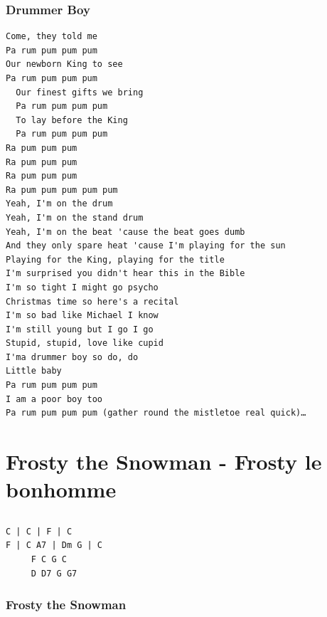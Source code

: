\documentclass[
]{article}
\begin{document}
\hypertarget{drummer-boy}{%
\subsubsection*{Drummer Boy}\label{drummer-boy}}

\begin{verbatim}
Come, they told me
Pa rum pum pum pum
Our newborn King to see
Pa rum pum pum pum
  Our finest gifts we bring
  Pa rum pum pum pum
  To lay before the King
  Pa rum pum pum pum
Ra pum pum pum
Ra pum pum pum
Ra pum pum pum
Ra pum pum pum pum pum
Yeah, I'm on the drum
Yeah, I'm on the stand drum
Yeah, I'm on the beat 'cause the beat goes dumb
And they only spare heat 'cause I'm playing for the sun
Playing for the King, playing for the title
I'm surprised you didn't hear this in the Bible
I'm so tight I might go psycho
Christmas time so here's a recital
I'm so bad like Michael I know
I'm still young but I go I go
Stupid, stupid, love like cupid
I'ma drummer boy so do, do
Little baby
Pa rum pum pum pum
I am a poor boy too
Pa rum pum pum pum (gather round the mistletoe real quick)… 
\end{verbatim}

\hypertarget{frosty-the-snowman---frosty-le-bonhomme}{%
\section{Frosty the Snowman - Frosty le
bonhomme}\label{frosty-the-snowman---frosty-le-bonhomme}}

\hypertarget{section-8}{%
\subsection*{}\label{section-8}}

\begin{verbatim}
C | C | F | C 
F | C A7 | Dm G | C
     F C G C 
     D D7 G G7
\end{verbatim}

\hypertarget{frosty-the-snowman}{%
\subsubsection*{Frosty the Snowman}\label{frosty-the-snowman}}
\end{document}
